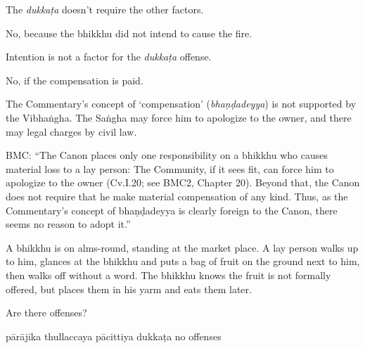\begin{exam}{\autoExamName}
\begin{problem}
\begin{manswers}{1}
    \begin{solution}
      The \emph{dukkaṭa} doesn't require the other factors.
    \end{solution}

     No, because the bhikkhu did not intend to cause the fire. \eAns

    \begin{solution}
      Intention is not a factor for the \emph{dukkaṭa} offense.
    \end{solution}

     No, if the compensation is paid. \eAns

    \begin{solution}
      The Commentary's concept of `compensation' (\emph{bhaṇḍadeyya}) is not supported by the Vibhaṅgha.
      The Saṅgha may force him to apologize to the owner, and there may legal charges by civil law.

      BMC: ``The Canon places only one responsibility on a bhikkhu who causes material loss to a lay person: The Community, if it sees fit, can force him to apologize to the owner (Cv.I.20; see BMC2, Chapter 20). Beyond that, the Canon does not require that he make material compensation of any kind. Thus, as the Commentary's concept of bhaṇḍadeyya is clearly foreign to the Canon, there seems no reason to adopt it.''
    \end{solution}

    \eChoices
  \end{manswers}

\end{problem}

\ifnosolutions
\clearpage
\fi

\begin{problem}

  A bhikkhu is on alms-round, standing at the market place.
  A lay person walks up to him,
  glances at the bhikkhu and puts a bag of fruit on the ground next to him,
  then walks off without a word.
  The bhikkhu knows the fruit is not formally offered,
  but places them in his yarm and eats them later.

  Are there offenses?

  \bigskip

  \begin{answers}{5}
    \bChoices
     pārājika\eAns
     thullaccaya\eAns
     pācittiya\eAns
     dukkaṭa\eAns
     no offenses\eAns
    \eChoices
  \end{answers}


\end{problem}
\end{exam}
